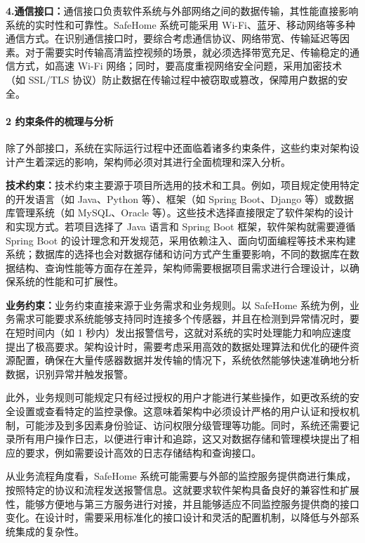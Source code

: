 \textbf{4.通信接口：}通信接口负责软件系统与外部网络之间的数据传输，其性能直接影响系统的实时性和可靠性。SafeHome 系统可能采用 Wi-Fi、蓝牙、移动网络等多种通信方式。在识别通信接口时，要综合考虑通信协议、网络带宽、传输延迟等因素。对于需要实时传输高清监控视频的场景，就必须选择带宽充足、传输稳定的通信方式，如高速 Wi-Fi 网络；同时，要高度重视网络安全问题，采用加密技术（如 SSL/TLS 协议）防止数据在传输过程中被窃取或篡改，保障用户数据的安全。

\paragraph{2 约束条件的梳理与分析}\label{ux7ea6ux675fux6761ux4ef6ux7684ux68b3ux7406ux4e0eux5206ux6790}

除了外部接口，系统在实际运行过程中还面临着诸多约束条件，这些约束对架构设计产生着深远的影响，架构师必须对其进行全面梳理和深入分析。

\textbf{技术约束：}技术约束主要源于项目所选用的技术和工具。例如，项目规定使用特定的开发语言（如 Java、Python 等）、框架（如 Spring Boot、Django 等）或数据库管理系统（如 MySQL、Oracle 等）。这些技术选择直接限定了软件架构的设计和实现方式。若项目选择了 Java 语言和 Spring Boot 框架，软件架构就需要遵循 Spring Boot 的设计理念和开发规范，采用依赖注入、面向切面编程等技术来构建系统；数据库的选择也会对数据存储和访问方式产生重要影响，不同的数据库在数据结构、查询性能等方面存在差异，架构师需要根据项目需求进行合理设计，以确保系统的性能和可扩展性。

\textbf{业务约束：}业务约束直接来源于业务需求和业务规则。以 SafeHome 系统为例，业务需求可能要求系统能够支持同时连接多个传感器，并且在检测到异常情况时，要在短时间内（如 1 秒内）发出报警信号，这就对系统的实时处理能力和响应速度提出了极高要求。架构设计时，需要考虑采用高效的数据处理算法和优化的硬件资源配置，确保在大量传感器数据并发传输的情况下，系统依然能够快速准确地分析数据，识别异常并触发报警。

此外，业务规则可能规定只有经过授权的用户才能进行某些操作，如更改系统的安全设置或查看特定的监控录像。这意味着架构中必须设计严格的用户认证和授权机制，可能涉及到多因素身份验证、访问权限分级管理等功能。同时，系统还需要记录所有用户操作日志，以便进行审计和追踪，这又对数据存储和管理模块提出了相应的要求，例如需要设计高效的日志存储结构和查询接口。

从业务流程角度看，SafeHome 系统可能需要与外部的监控服务提供商进行集成，按照特定的协议和流程发送报警信息。这就要求软件架构具备良好的兼容性和扩展性，能够方便地与第三方服务进行对接，并且能够适应不同监控服务提供商的接口变化。在设计时，需要采用标准化的接口设计和灵活的配置机制，以降低与外部系统集成的复杂性。

